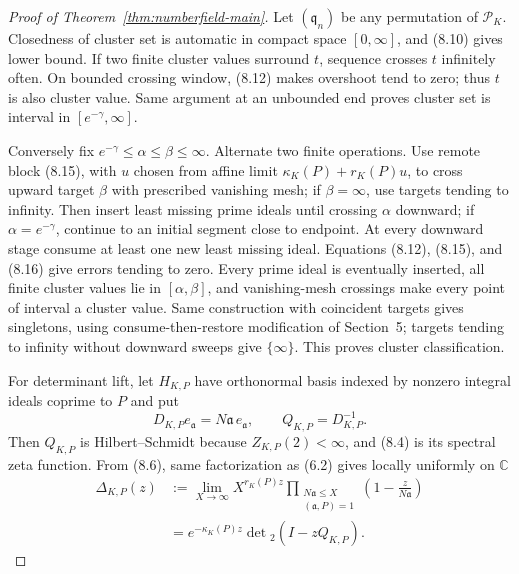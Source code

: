 \documentclass[11pt]{article}
\theoremstyle{definition}
\theoremstyle{remark}
\newcommand{\C}{\mathbb C}
\begin{document}
\begin{proof}[Proof of Theorem~\ref{thm:numberfield-main}]
Let $(\mathfrak q_n)$ be any permutation of $\mathcal P_K$.  Closedness of cluster set is
automatic in compact space $[0,\infty]$, and (8.10) gives lower bound.  If two finite cluster
values surround $t$, sequence crosses $t$ infinitely often.  On bounded crossing window,
(8.12) makes overshoot tend to zero; thus $t$ is also cluster value.  Same argument at an
unbounded end proves cluster set is interval in $[e^{-\gamma},\infty]$.

Conversely fix $e^{-\gamma}\leq\alpha\leq\beta\leq\infty$.  Alternate two finite operations.
Use remote block (8.15), with $u$ chosen from affine limit
$\kappa_K(P)+r_K(P)u$, to cross upward target $\beta$ with prescribed vanishing mesh; if
$\beta=\infty$, use targets tending to infinity.  Then insert least missing prime ideals until
crossing $\alpha$ downward; if $\alpha=e^{-\gamma}$, continue to an initial segment close to
endpoint.  At every downward stage consume at least one new least missing ideal.  Equations
(8.12), (8.15), and (8.16) give errors tending to zero.  Every prime ideal is eventually
inserted, all finite cluster values lie in $[\alpha,\beta]$, and vanishing-mesh crossings make
every point of interval a cluster value.  Same construction with coincident targets gives
singletons, using consume-then-restore modification of Section~5; targets tending to infinity
without downward sweeps give $\{\infty\}$.  This proves cluster classification.

For determinant lift, let $H_{K,P}$ have orthonormal basis indexed by nonzero integral ideals
coprime to $P$ and put
\[
 D_{K,P}e_{\mathfrak a}=N\mathfrak a\,e_{\mathfrak a},\qquad
 Q_{K,P}=D_{K,P}^{-1}.
\]
Then $Q_{K,P}$ is Hilbert--Schmidt because $Z_{K,P}(2)<\infty$, and (8.4) is its spectral zeta
function.  From (8.6), same factorization as (6.2) gives locally uniformly on $\C$
\begin{align}
 \Delta_{K,P}(z)
 &:=\lim_{X\to\infty}X^{r_K(P)z}
 \prod_{\substack{N\mathfrak a\leq X\\(\mathfrak a,P)=1}}
       \left(1-\frac z{N\mathfrak a}\right)                       \tag{8.20}\\
 &=e^{-\kappa_K(P)z}\det{}_2(I-zQ_{K,P}).                         \tag{8.21}
\end{align}


\end{proof}
\end{document}
